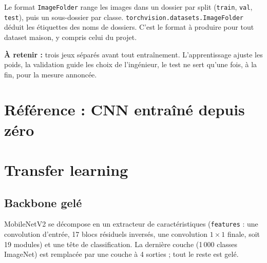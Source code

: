 Le format \texttt{ImageFolder} range les images dans un dossier par split (\texttt{train}, \texttt{val}, \texttt{test}), puis un sous-dossier par classe. \texttt{torchvision.datasets.ImageFolder} déduit les étiquettes des noms de dossiers. C'est le format à produire pour tout dataset maison, y compris celui du projet. \\




\begin{imp}
\textbf{À retenir :} trois jeux séparés avant tout entraînement. L'apprentissage ajuste les poids, la validation guide les choix de l'ingénieur, le test ne sert qu'une fois, à la fin, pour la mesure annoncée.
\end{imp}

\section{Référence : CNN entraîné depuis zéro}


\section{Transfer learning}

\subsection{Backbone gelé}

MobileNetV2 \cite{sandler2018mobilenetv2} se décompose en un extracteur de caractéristiques (\texttt{features} : une convolution d'entrée, 17 blocs résiduels inversés, une convolution $1 \times 1$ finale, soit 19 modules) et une tête de classification. La dernière couche (1\,000 classes ImageNet) est remplacée par une couche à 4 sorties ; tout le reste est gelé. \\

